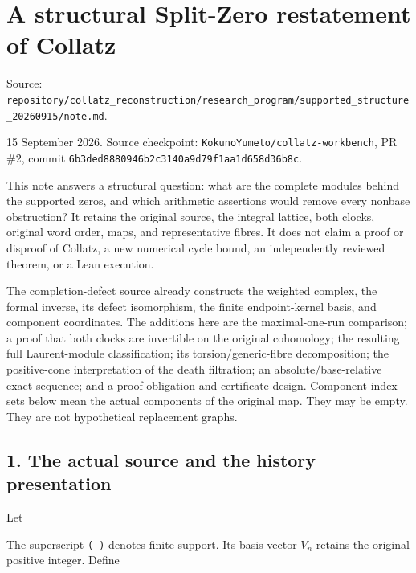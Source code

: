 \chapter{A structural Split-Zero restatement of Collatz}
{\small\sffamily Source: \nolinkurl{repository/collatz_reconstruction/research_program/supported_structure_20260915/note.md}.\par}


15 September 2026. Source checkpoint:
\nolinkurl{KokunoYumeto/collatz-workbench}, PR \#2, commit
\nolinkurl{6b3ded8880946b2c3140a9d79f1aa1d658d36b8c}.

This note answers a structural question: what are the complete modules
behind the supported zeros, and which arithmetic assertions would remove
every nonbase obstruction? It retains the original source, the integral
lattice, both clocks, original word order, maps, and representative
fibres. It does not claim a proof or disproof of Collatz, a new
numerical cycle bound, an independently reviewed theorem, or a Lean
execution.

The completion-defect source already constructs the weighted complex,
the formal inverse, its defect isomorphism, the finite endpoint-kernel
basis, and component coordinates. The additions here are the
maximal-one-run comparison; a proof that both clocks are invertible on
the original cohomology; the resulting full Laurent-module
classification; its torsion/generic-fibre decomposition; the
positive-cone interpretation of the death filtration; an
absolute/base-relative exact sequence; and a proof-obligation and
certificate design. Component index sets below mean the actual
components of the original map. They may be empty. They are not
hypothetical replacement graphs.

\section{1. The actual source and the history presentation}

Let


The superscript \nolinkurl{( )} denotes finite support. Its basis vector
\(V_n\) retains the original positive integer. Define


